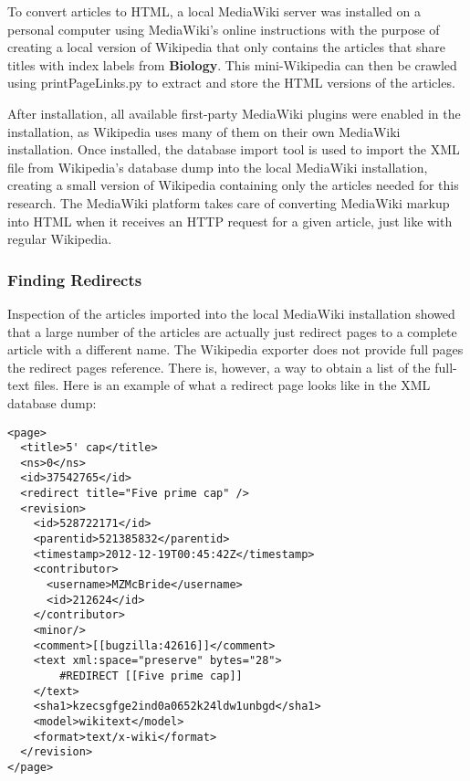 To convert articles to HTML, a local MediaWiki server was installed on a personal computer using MediaWiki's online instructions \cite{mediawiki-installation} with the purpose of creating a local version of Wikipedia that only contains the articles that share titles with index labels from {\bf Biology}.
This mini-Wikipedia can then be crawled using printPageLinks.py to extract and store the HTML versions of the articles.

After installation, all available first-party MediaWiki plugins were enabled in the installation, as Wikipedia uses many of them on their own MediaWiki installation.
Once installed, the database import tool \cite{mediawiki-import} is used to import the XML file from Wikipedia's database dump into the local MediaWiki installation, creating a small version of Wikipedia containing only the articles needed for this research.
The MediaWiki platform takes care of converting MediaWiki markup into HTML when it receives an HTTP request for a given article, just like with regular Wikipedia.

\subsubsection{Finding Redirects}
\label{sec:finding-redirects}

Inspection of the articles imported into the local MediaWiki installation showed that a large number of the articles are actually just redirect pages to a complete article with a different name.
The Wikipedia exporter does not provide full pages the redirect pages reference.
There is, however, a way to obtain a list of the full-text files.
Here is an example of what a redirect page looks like in the XML database dump:

\begin{lstlisting}
<page>
  <title>5' cap</title>
  <ns>0</ns>
  <id>37542765</id>
  <redirect title="Five prime cap" />
  <revision>
    <id>528722171</id>
    <parentid>521385832</parentid>
    <timestamp>2012-12-19T00:45:42Z</timestamp>
    <contributor>
      <username>MZMcBride</username>
      <id>212624</id>
    </contributor>
    <minor/>
    <comment>[[bugzilla:42616]]</comment>
    <text xml:space="preserve" bytes="28">
        #REDIRECT [[Five prime cap]]
    </text>
    <sha1>kzecsgfge2ind0a0652k24ldw1unbgd</sha1>
    <model>wikitext</model>
    <format>text/x-wiki</format>
  </revision>
</page>
\end{lstlisting}

